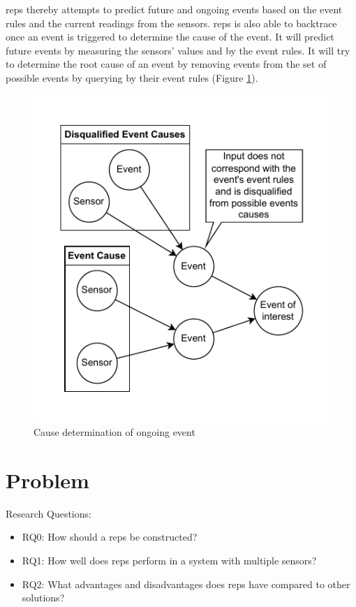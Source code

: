 \documentclass[a4paper,8pt]{article}
\begin{document}
		\gls{reps} thereby attempts to predict future and ongoing events based on the event rules and the current readings from the sensors. \gls{reps} is also able to backtrace once an event is triggered to determine the cause of the event. It will predict future events by measuring the sensors' values and by the event rules. It will try to determine the root cause of an event by removing events from the set of possible events by querying by their event rules (Figure \ref{fig:EventRuleBroken}).
		\begin{figure}[!h]
			\centering
			\includegraphics[width=.7\textwidth]{EventRuleBroken}
			\caption{Cause determination of ongoing event}
			\label{fig:EventRuleBroken}
		\end{figure}
		\newpage
	\section{Problem}
		Research Questions:
		\begin{itemize}
			\item RQ0: How should a \gls{reps} be constructed?
			\item RQ1: How well does \gls{reps} perform in a system with multiple sensors?
			\item RQ2: What advantages and disadvantages does \gls{reps} have compared to other solutions?
		\end{itemize}
\end{document}
